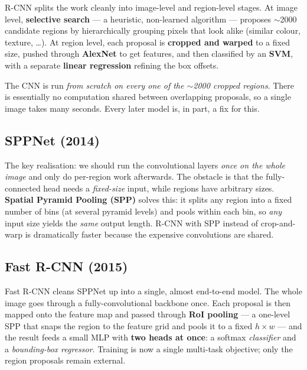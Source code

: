 \documentclass[11pt, oneside]{book}
\begin{document}
R-CNN splits the work cleanly into image-level and region-level stages.
At image level, \textbf{selective search} --- a heuristic, non-learned algorithm
--- proposes $\sim$2000 candidate regions by hierarchically grouping pixels that
look alike (similar colour, texture, \dots). At region level, each proposal is
\textbf{cropped and warped} to a fixed size, pushed through \textbf{AlexNet} to
get features, and then classified by an \textbf{SVM}, with a separate
\textbf{linear regression} refining the box offsets.

\begin{notebox}[title={Why R-CNN is slow}]
The CNN is run \emph{from scratch on every one of the $\sim$2000 cropped regions}.
There is essentially no computation shared between overlapping proposals, so a
single image takes many seconds. Every later model is, in part, a fix for this.
\end{notebox}

\subsection{SPPNet (2014)}

The key realisation: we should run the convolutional layers \emph{once on the
whole image} and only do per-region work afterwards. The obstacle is that the
fully-connected head needs a \emph{fixed-size} input, while regions have arbitrary
sizes. \textbf{Spatial Pyramid Pooling (SPP)} solves this: it splits any region
into a fixed number of bins (at several pyramid levels) and pools within each bin,
so \emph{any} input size yields the \emph{same} output length. R-CNN with SPP
instead of crop-and-warp is dramatically faster because the expensive convolutions
are shared.

\subsection{Fast R-CNN (2015)}

Fast R-CNN cleans SPPNet up into a single, almost end-to-end model. The whole
image goes through a fully-convolutional backbone once. Each proposal is then
mapped onto the feature map and passed through \textbf{RoI pooling} --- a
one-level SPP that snaps the region to the feature grid and pools it to a fixed
$h\times w$ --- and the result feeds a small MLP with \textbf{two heads at once}:
a softmax \emph{classifier} and a \emph{bounding-box regressor}. Training is now a
single multi-task objective; only the region proposals remain external.
\end{document}
